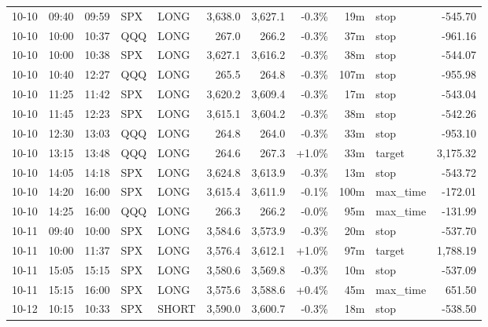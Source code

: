 \documentclass[11pt,a4paper,twoside]{article}
\begin{document}
\begin{center}
\begin{longtable}{>{\color{txtmain}}l l l l l r r r r >{\color{txtmain}}l r}
10-10 & 09:40 & 09:59 & SPX & LONG & 3,638.0 & 3,627.1 & \textcolor{lossred}{-0.3\%} & 19m & stop & \textcolor{lossred}{-545.70} \\
10-10 & 10:00 & 10:37 & QQQ & LONG & 267.0 & 266.2 & \textcolor{lossred}{-0.3\%} & 37m & stop & \textcolor{lossred}{-961.16} \\
10-10 & 10:00 & 10:38 & SPX & LONG & 3,627.1 & 3,616.2 & \textcolor{lossred}{-0.3\%} & 38m & stop & \textcolor{lossred}{-544.07} \\
10-10 & 10:40 & 12:27 & QQQ & LONG & 265.5 & 264.8 & \textcolor{lossred}{-0.3\%} & 107m & stop & \textcolor{lossred}{-955.98} \\
10-10 & 11:25 & 11:42 & SPX & LONG & 3,620.2 & 3,609.4 & \textcolor{lossred}{-0.3\%} & 17m & stop & \textcolor{lossred}{-543.04} \\
10-10 & 11:45 & 12:23 & SPX & LONG & 3,615.1 & 3,604.2 & \textcolor{lossred}{-0.3\%} & 38m & stop & \textcolor{lossred}{-542.26} \\
10-10 & 12:30 & 13:03 & QQQ & LONG & 264.8 & 264.0 & \textcolor{lossred}{-0.3\%} & 33m & stop & \textcolor{lossred}{-953.10} \\
10-10 & 13:15 & 13:48 & QQQ & LONG & 264.6 & 267.3 & \textcolor{wingreen}{+1.0\%} & 33m & target & \textcolor{wingreen}{3,175.32} \\
10-10 & 14:05 & 14:18 & SPX & LONG & 3,624.8 & 3,613.9 & \textcolor{lossred}{-0.3\%} & 13m & stop & \textcolor{lossred}{-543.72} \\
10-10 & 14:20 & 16:00 & SPX & LONG & 3,615.4 & 3,611.9 & \textcolor{lossred}{-0.1\%} & 100m & max\_time & \textcolor{lossred}{-172.01} \\
10-10 & 14:25 & 16:00 & QQQ & LONG & 266.3 & 266.2 & \textcolor{lossred}{-0.0\%} & 95m & max\_time & \textcolor{lossred}{-131.99} \\
10-11 & 09:40 & 10:00 & SPX & LONG & 3,584.6 & 3,573.9 & \textcolor{lossred}{-0.3\%} & 20m & stop & \textcolor{lossred}{-537.70} \\
10-11 & 10:00 & 11:37 & SPX & LONG & 3,576.4 & 3,612.1 & \textcolor{wingreen}{+1.0\%} & 97m & target & \textcolor{wingreen}{1,788.19} \\
10-11 & 15:05 & 15:15 & SPX & LONG & 3,580.6 & 3,569.8 & \textcolor{lossred}{-0.3\%} & 10m & stop & \textcolor{lossred}{-537.09} \\
10-11 & 15:15 & 16:00 & SPX & LONG & 3,575.6 & 3,588.6 & \textcolor{wingreen}{+0.4\%} & 45m & max\_time & \textcolor{wingreen}{651.50} \\
10-12 & 10:15 & 10:33 & SPX & SHORT & 3,590.0 & 3,600.7 & \textcolor{lossred}{-0.3\%} & 18m & stop & \textcolor{lossred}{-538.50} \\

\end{longtable}
\end{center}
\end{document}
